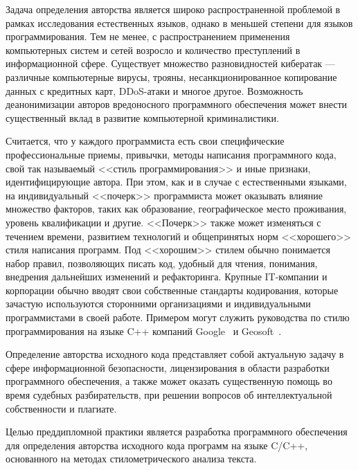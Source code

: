 Задача определения авторства является широко распространенной проблемой в рамках исследования 
естественных языков, однако в меньшей степени для языков программирования. 
Тем не менее, с распространением применения компьютерных систем и сетей возросло и количество преступлений в 
информационной сфере. Существует множество разновидностей кибератак --- различные компьютерные вирусы, 
трояны, несанкционированное копирование данных с кредитных карт, DDoS-атаки и многое другое. 
Возможность деанонимизации авторов вредоносного программного обеспечения может внести существенный вклад 
в развитие компьютерной криминалистики.

Считается, что у каждого программиста есть свои специфические профессиональные приемы, 
привычки, методы написания программного кода, свой так называемый <<стиль программирования>> и 
иные признаки, идентифицирующие автора. При этом, как и в случае с естественными языками, 
на индивидуальный <<почерк>> программиста может оказывать влияние
множество факторов, таких как образование, географическое место проживания, уровень квалификации и другие. 
<<Почерк>> также может изменяться с течением времени, развитием технологий и общепринятых норм <<хорошего>> стиля
написания программ. Под <<хорошим>> стилем обычно понимается набор правил, позволяющих писать 
код, удобный для чтения, понимания, внедрения дальнейших изменений и рефакторинга.
Крупные IT-компании и корпорации обычно вводят свои собственные стандарты кодирования, которые  
зачастую используются сторонними организациями и индивидуальными программистами в своей работе.
Примером могут служить руководства по стилю программирования на языке C++ компаний Google~\cite{google_style} и Geosoft~\cite{geosoft}.


Определение авторства исходного кода представляет собой актуальную задачу в сфере информационной 
безопасности, лицензирования в области разработки программного обеспечения, а также может оказать 
существенную помощь во время судебных разбирательств, при решении вопросов об интеллектуальной 
собственности и плагиате.

Целью преддипломной практики является разработка программного обеспечения для определения авторства 
исходного кода программ на языке C/C++, основанного на методах стилометрического анализа текста.
